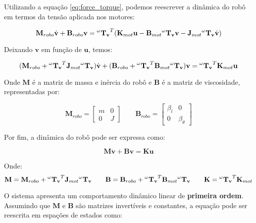 Utilizando a equação \ref{eq:force_torque}, 
podemos reescrever a dinâmica do robô em 
termos da tensão aplicada nos motores:

\begin{equation}
\mathbf{M}_{robo} \dot{\mathbf{v}} + \mathbf{B}_{robo} \mathbf{v} = 
\mathbf{\prescript{\omega}{}{T_v}}^T (\mathbf{K}_{mot} \mathbf{u} - \mathbf{B}_{mot} \mathbf{\prescript{\omega}{}{T_v}} \mathbf{v} - \mathbf{J}_{mot} \mathbf{\prescript{\omega}{}{T_v}} \dot{\mathbf{v}})
\end{equation}

Deixando $\mathbf{v}$ em função de $\mathbf{u}$, temos:

\begin{equation}
(\mathbf{M}_{robo} + \mathbf{\prescript{\omega}{}{T_v}}^T \mathbf{J}_{mot} \mathbf{\prescript{\omega}{}{T_v}}) \dot{\mathbf{v}}
+
(\mathbf{B}_{robo} + \mathbf{\prescript{\omega}{}{T_v}}^T \mathbf{B}_{mot} \mathbf{\prescript{\omega}{}{T_v}}) \mathbf{v}
=
\mathbf{\prescript{\omega}{}{T_v}}^T \mathbf{K}_{mot} \mathbf{u}
\end{equation}

Onde $\mathbf{M}$ é a matriz de massa e inércia do robô e 
$\mathbf{B}$ é a matriz de viscosidade, representadas por:

\[
\mathbf{M}_{robo} =
\begin{bmatrix}
m & 0 \\
0 & J
\end{bmatrix}
\qquad
\mathbf{B}_{robo} =
\begin{bmatrix}
\beta_l & 0 \\
0 & \beta_{\theta}
\end{bmatrix}
\]

Por fim, a dinâmica do robô pode ser expressa como:

\begin{equation}
\mathbf{M} \dot{\mathbf{v}} + \mathbf{B} \mathbf{v} = \mathbf{K} \mathbf{u}
\label{eq:robot_dynamics}
\end{equation}

Onde:
\[
\mathbf{M} = \mathbf{M}_{robo} + \mathbf{\prescript{\omega}{}{T_v}}^T \mathbf{J}_{mot} \mathbf{\prescript{\omega}{}{T_v}}
\qquad
\mathbf{B} = \mathbf{B}_{robo} + \mathbf{\prescript{\omega}{}{T_v}}^T \mathbf{B}_{mot} \mathbf{\prescript{\omega}{}{T_v}}
\qquad
\mathbf{K} = \mathbf{\prescript{\omega}{}{T_v}}^T \mathbf{K}_{mot}
\]

O sistema apresenta um comportamento dinâmico linear de 
\textbf{primeira ordem}. Assumindo que $\mathbf{M}$ 
e $\mathbf{B}$ são matrizes invertíveis e constantes, 
a equação pode ser reescrita em espações de estados como:

